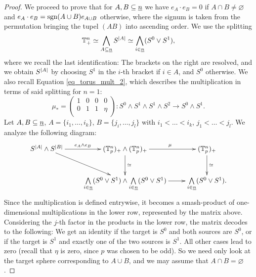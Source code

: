 \begin{lem}
\begin{proof}
We proceed to prove that for $A,B \subseteq \underline{n}$ we have $e_A \cdot e_B = 0$ if $A \cap B \neq \varnothing$ and $e_A \cdot e_B = \operatorname{sgn}(A \cup B) e_{A\cup B}$ otherwise, where the signum is taken from the permutation bringing the tupel $(AB)$ into ascending order. We use the splitting%
$$\sT^n_+ \simeq \bigwedge_{ A \subseteq \ind{n} } S^{\abs{A}} \simeq %
\bigwedge_{ i \in \ind{n} } (S^0 \vee S^1),$$
where we recall the last identification: The brackets on the right are resolved, and we obtain $S^{\left\vert A\right\vert}$ by choosing $S^1$ in the $i$-th bracket if $i \in A$, and $S^0$ otherwise. We also recall Equation \ref{eq_torus_mult_2}, which describes the multiplication in terms of said splitting for $n=1$:
\begin{equation*}\mu_* = %
\left( \begin{array}{cccc}
1 & 0 & 0 & 0 \\
0 & 1 & 1 & \eta \\
\end{array} \right): S^0 \wedge S^1 \wedge S^1 \wedge S^2 \to S^0 \wedge S^1 .\end{equation*}
Let $A, B \subseteq \underline{n}$, $A = \{i_1, \ldots, i_k\}$, $B = \{j_i, \ldots, j_l \}$ with $i_1 \less \ldots \less i_k$, $j_1 \less \ldots \less j_l$. We analyze the following diagram:
\[
\xymatrix{
  S^{\abs{A}} \wedge S^{\abs{B}} \ar[r]^-{e_A \wedge e_B} \ar[dr] & %
  (\sT_p^n)_+ \wedge (\sT_p^n)_+ \ar[r]^(.55){\mu} \ar[d]^{\simeq} & %
  (\sT_p^n)_+ \ar[d]^{\simeq} \\ %
  & %
  \bigwedge\limits_{i \in \n} (S^0 \vee S^1) \wedge %
    \bigwedge\limits_{i \in \n} (S^0 \vee S^1) \ar[r] & %
  \bigwedge\limits_{i \in \n} (S^0 \vee S^1).
}
\]
Since the multiplication is defined entrywise, it becomes a smash-product of one-dimensional multiplications in the lower row, represented by the matrix above. Considering the $j$-th factor in the products in the lower row, the matrix decodes to the following: We get an identity if the target is $S^0$ and both sources are $S^0$, or if the target is $S^1$ and exactly one of the two sources is $S^1$. All other cases lead to zero (recall that $\eta$ is zero, since $p$ was chosen to be odd). So we need only look at the target sphere corresponding to $A \cup B$, and we may assume that $A \cap B = \varnothing$.


\end{proof}
\end{lem}
